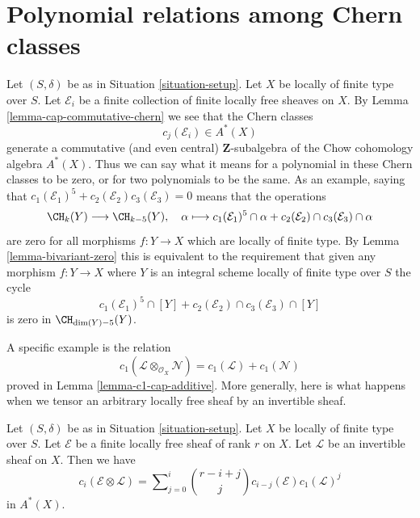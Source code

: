 \section{Polynomial relations among Chern classes}
\label{section-relations-chern-classes}

\noindent
Let $(S, \delta)$ be as in Situation \ref{situation-setup}. Let $X$ be locally
of finite type over $S$. Let $\mathcal{E}_i$ be a finite collection of finite
locally free sheaves on $X$. By Lemma \ref{lemma-cap-commutative-chern}
we see that the Chern classes
$$
c_j(\mathcal{E}_i) \in A^*(X)
$$
generate a commutative (and even central) $\mathbf{Z}$-subalgebra of the
Chow cohomology algebra $A^*(X)$.
Thus we can say what it means for a polynomial in these Chern classes
to be zero, or for two polynomials to be the same. As an example, saying that
$c_1(\mathcal{E}_1)^5 + c_2(\mathcal{E}_2)c_3(\mathcal{E}_3) = 0$
means that the operations
$$
\CH_k(Y) \longrightarrow \CH_{k - 5}(Y), \quad
\alpha \longmapsto
c_1(\mathcal{E}_1)^5 \cap \alpha +
c_2(\mathcal{E}_2) \cap c_3(\mathcal{E}_3) \cap \alpha
$$
are zero for all morphisms $f : Y \to X$ which are locally of finite type.
By Lemma \ref{lemma-bivariant-zero}
this is equivalent to the requirement that given any morphism
$f : Y \to X$  where $Y$ is an integral scheme
locally of finite type over $S$ the cycle
$$
c_1(\mathcal{E}_1)^5 \cap [Y] +
c_2(\mathcal{E}_2) \cap c_3(\mathcal{E}_3) \cap [Y]
$$
is zero in $\CH_{\dim(Y) - 5}(Y)$.

\medskip\noindent
A specific example is the relation
$$
c_1(\mathcal{L} \otimes_{\mathcal{O}_X} \mathcal{N})
=
c_1(\mathcal{L}) + c_1(\mathcal{N})
$$
proved in Lemma \ref{lemma-c1-cap-additive}.
More generally, here is what happens when we tensor an
arbitrary locally free sheaf by an invertible sheaf.

\begin{lemma}
\label{lemma-chern-classes-E-tensor-L}
Let $(S, \delta)$ be as in Situation \ref{situation-setup}.
Let $X$ be locally of finite type over $S$.
Let $\mathcal{E}$ be a finite locally free sheaf of
rank $r$ on $X$. Let $\mathcal{L}$ be an invertible
sheaf on $X$. Then we have
\begin{equation}
\label{equation-twist}
c_i({\mathcal E} \otimes {\mathcal L})
=
\sum\nolimits_{j = 0}^i
\binom{r - i + j}{j} c_{i - j}({\mathcal E}) c_1({\mathcal L})^j
\end{equation}
in $A^*(X)$.
\end{lemma}

